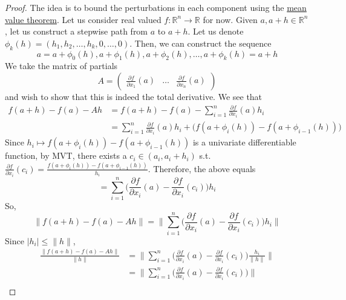 	\begin{proof}
		The idea is to bound the perturbations in each component using the \hyperref[real-thm:mvt]{mean value theorem}. Let us consider real valued $f: \mathbb{R}^n \to \mathbb{R}$ for now. Given $a, a + h \in \mathbb{R}^n$, let us construct a stepwise path from $a$ to $a + h$. Let us denote $\phi_k (h) = (h_1, h_2, \ldots, h_k, 0, \ldots, 0)$. Then, we can construct the sequence 
		\begin{equation}
		  a = a + \phi_0(h), a + \phi_1(h), a + \phi_2 (h), \ldots, a + \phi_k (h) = a + h
		\end{equation} 
		We take the matrix of partials 
		\begin{equation}
			A = \begin{pmatrix} \frac{\partial f}{\partial x_1} (a) & \ldots & \frac{\partial f}{\partial x_n} (a) \end{pmatrix}
		\end{equation}
		and wish to show that this is indeed the total derivative. We see that 
		\begin{align}
			f(a + h) - f(a) - Ah & = f(a + h) - f(a) - \sum_{i=1}^n \frac{\partial f}{\partial x_i} (a) h_i \\ 
													 & = \sum_{i=1}^n \frac{\partial f}{\partial x_i} (a) h_i + \big( f(a + \phi_i(h)) - f(a + \phi_{i-1}(h)) \big) 
		\end{align}
		Since $h_i \mapsto f(a + \phi_i(h)) - f(a + \phi_{i-1}(h))$ is a univariate differentiable function, by MVT, there exists a $c_i \in (a_i, a_i + h_i)$ s.t. $\frac{\partial f}{\partial x_i} (c_i) = \frac{f(a + \phi_i(h)) - f(a + \phi_{i-1}(h))}{h_i}$. Therefore, the above equals 
		\begin{equation}
			= \sum_{i=1}^n \bigg( \frac{\partial f}{\partial x_i}(a) - \frac{\partial f}{\partial x_i}(c_i) \bigg) h_i
		\end{equation}
		So, 
		\begin{equation}
			\|f(a + h) - f(a) - Ah\| = \bigg\| \sum_{i=1}^n \bigg( \frac{\partial f}{\partial x_i}(a) - \frac{\partial f}{\partial x_i}(c_i) \bigg) h_i \bigg\|
		\end{equation}
		Since $|h_i| \leq \|h\|$, 
		\begin{align}
			\frac{\|f(a + h) - f(a) - Ah\|}{\|h\|} & = \bigg\| \sum_{i=1}^n \bigg( \frac{\partial f}{\partial x_i} (a) - \frac{\partial f}{\partial x_i} (c_i) \bigg) \frac{h_i}{\|h\|} \bigg\| \\ 
																						 & = \bigg\| \sum_{i=1}^n \bigg( \frac{\partial f}{\partial x_i} (a) - \frac{\partial f}{\partial x_i} (c_i) \bigg) \bigg\| \\ 

\end{align}
\end{proof}
